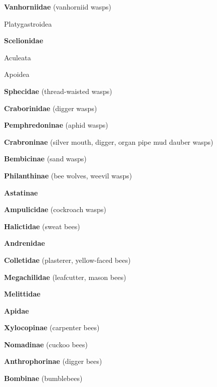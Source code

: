 \documentclass[letterpaper,10pt]{article}
\begin{document}
{\makebox[0.6cm]{}  \textbf{Vanhorniidae} (vanhorniid wasps) \par
\makebox[0.4cm]{}  Platygastroidea  \par
\makebox[0.6cm]{}  \textbf{Scelionidae} \par
\makebox[0.2cm]{}  Aculeata \par
\makebox[0.4cm]{}  Apoidea \par
\makebox[0.6cm]{}  \textbf{Sphecidae} (thread-waisted wasps) \par
\makebox[0.6cm]{}  \textbf{Craborinidae} (digger wasps) \par
\makebox[0.8cm]{}  \textbf{Pemphredoninae} (aphid wasps) \par
\makebox[0.8cm]{}  \textbf{Crabroninae} (silver mouth, digger, organ pipe mud dauber wasps) \par
\makebox[0.8cm]{}  \textbf{Bembicinae} (sand wasps) \par
\makebox[0.8cm]{}  \textbf{Philanthinae} (bee wolves, weevil wasps) \par
\makebox[0.8cm]{}  \textbf{Astatinae} \par
\makebox[0.6cm]{}  \textbf{Ampulicidae} (cockroach wasps) \par
\makebox[0.6cm]{}  \textbf{Halictidae} (sweat bees) \par
\makebox[0.6cm]{}  \textbf{Andrenidae} \par
\makebox[0.6cm]{}  \textbf{Colletidae} (plasterer, yellow-faced bees) \par
\makebox[0.6cm]{}  \textbf{Megachilidae} (leafcutter, mason bees) \par
\makebox[0.6cm]{}  \textbf{Melittidae} \par
\makebox[0.6cm]{}  \textbf{Apidae} \par
\makebox[0.8cm]{}  \textbf{Xylocopinae} (carpenter bees) \par
\makebox[0.8cm]{}  \textbf{Nomadinae} (cuckoo bees) \par
\makebox[0.8cm]{}  \textbf{Anthrophorinae} (digger bees) \par
\makebox[0.8cm]{}  \textbf{Bombinae} (bumblebees) \par
}
\end{document}
